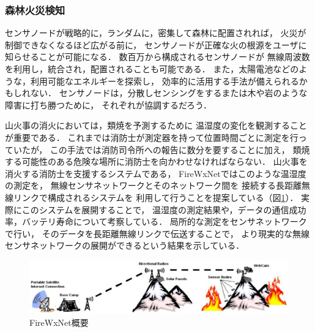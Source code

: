 \subsubsection{森林火災検知}

\vspace{0.5em}センサノードが戦略的に，ランダムに，密集して森林に配置されれば，
火災が制御できなくなるほど広がる前に，
センサノードが正確な火の根源をユーザに知らせることが可能になる．
数百万から構成されるセンサノードが
無線周波数を利用し，統合され，配置されることも可能である．
また，太陽電池などのような，利用可能なエネルギーを探索し，
効率的に活用する手法が備えられるかもしれない．
センサノードは，分散しセンシングをするまたは木や岩のような障害に打ち勝つために，
それぞれが協調するだろう．


山火事の消火においては，類焼を予測するために
温湿度の変化を観測することが重要である．
これまでは消防士が測定器を持って位置時間ごとに測定を行っていたが，
この手法では消防司令所への報告に数分を要することに加え，
類焼する可能性のある危険な場所に消防士を向かわせなければならない．
山火事を消火する消防士を支援するシステムである，
FireWxNet\cite{conf/mobisys/HartungHSH06}ではこのような温湿度の測定を，
無線センサネットワークとそのネットワーク間を
接続する長距離無線リンクで構成されるシステムを
利用して行うことを提案している（図\ref{fig:firewxnet_overview}）．
実際にこのシステムを展開することで，
温湿度の測定結果や，データの通信成功率，バッテリ寿命について考察している．
局所的な測定をセンサネットワークで行い，
そのデータを長距離無線リンクで伝送することで，
より現実的な無線センサネットワークの展開ができるという結果を示している．

\begin{figure}[htbp]
 \begin{center}
  \includegraphics[width=140mm]{./images/firewxnet_overview.eps}
 \end{center}
 \caption{FireWxNet概要}
 \label{fig:firewxnet_overview}
\end{figure}



